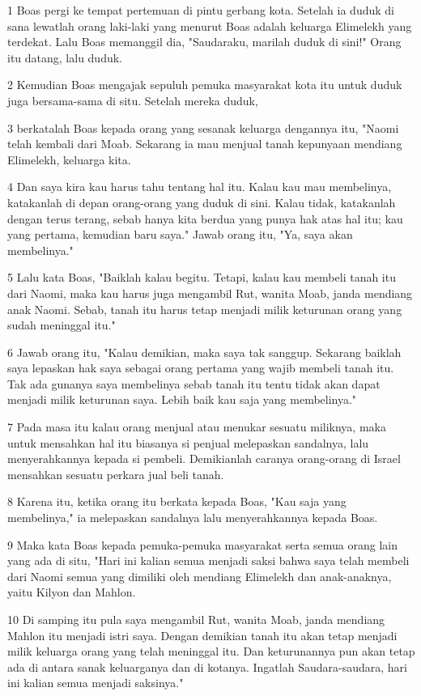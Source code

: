 \par 1 Boas pergi ke tempat pertemuan di pintu gerbang kota. Setelah ia duduk di sana lewatlah orang laki-laki yang menurut Boas adalah keluarga Elimelekh yang terdekat. Lalu Boas memanggil dia, "Saudaraku, marilah duduk di sini!" Orang itu datang, lalu duduk.
\par 2 Kemudian Boas mengajak sepuluh pemuka masyarakat kota itu untuk duduk juga bersama-sama di situ. Setelah mereka duduk,
\par 3 berkatalah Boas kepada orang yang sesanak keluarga dengannya itu, "Naomi telah kembali dari Moab. Sekarang ia mau menjual tanah kepunyaan mendiang Elimelekh, keluarga kita.
\par 4 Dan saya kira kau harus tahu tentang hal itu. Kalau kau mau membelinya, katakanlah di depan orang-orang yang duduk di sini. Kalau tidak, katakanlah dengan terus terang, sebab hanya kita berdua yang punya hak atas hal itu; kau yang pertama, kemudian baru saya." Jawab orang itu, "Ya, saya akan membelinya."
\par 5 Lalu kata Boas, "Baiklah kalau begitu. Tetapi, kalau kau membeli tanah itu dari Naomi, maka kau harus juga mengambil Rut, wanita Moab, janda mendiang anak Naomi. Sebab, tanah itu harus tetap menjadi milik keturunan orang yang sudah meninggal itu."
\par 6 Jawab orang itu, "Kalau demikian, maka saya tak sanggup. Sekarang baiklah saya lepaskan hak saya sebagai orang pertama yang wajib membeli tanah itu. Tak ada gunanya saya membelinya sebab tanah itu tentu tidak akan dapat menjadi milik keturunan saya. Lebih baik kau saja yang membelinya."
\par 7 Pada masa itu kalau orang menjual atau menukar sesuatu miliknya, maka untuk mensahkan hal itu biasanya si penjual melepaskan sandalnya, lalu menyerahkannya kepada si pembeli. Demikianlah caranya orang-orang di Israel mensahkan sesuatu perkara jual beli tanah.
\par 8 Karena itu, ketika orang itu berkata kepada Boas, "Kau saja yang membelinya," ia melepaskan sandalnya lalu menyerahkannya kepada Boas.
\par 9 Maka kata Boas kepada pemuka-pemuka masyarakat serta semua orang lain yang ada di situ, "Hari ini kalian semua menjadi saksi bahwa saya telah membeli dari Naomi semua yang dimiliki oleh mendiang Elimelekh dan anak-anaknya, yaitu Kilyon dan Mahlon.
\par 10 Di samping itu pula saya mengambil Rut, wanita Moab, janda mendiang Mahlon itu menjadi istri saya. Dengan demikian tanah itu akan tetap menjadi milik keluarga orang yang telah meninggal itu. Dan keturunannya pun akan tetap ada di antara sanak keluarganya dan di kotanya. Ingatlah Saudara-saudara, hari ini kalian semua menjadi saksinya."
